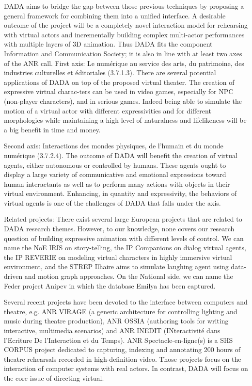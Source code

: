 DADA aims to bridge the gap between those previous techniques by proposing a general framework for combining them into a unified interface. A desirable outcome of the project will be a completely novel interaction model for rehearsing with virtual actors and incrementally building complex multi-actor performances with multiple layers of 3D animation. Thus DADA fits the component Information and Communication Society; it is also in line with at least two axes of the ANR call.
First axis: Le num\'erique au service des arts, du patrimoine, des industries culturelles et \'editoriales (3.7.1.3). There are several potential applications of DADA on top of the proposed virtual theater. The creation of expressive virtual charac-ters can be used in video games, especially for NPC (non-player characters), and in serious games. Indeed being able to simulate the motion of a virtual actor with different expressivities and for different morphologies while maintaining a high level of naturalness and lifelikeness will be a big benefit in time and money.


Second axis: Interactions des mondes physiques, de l'humain et du monde num\'erique (3.7.2.4). The outcome of DADA
will benefit the creation of virtual agents, either autonomous or controlled by humans. These agents ought to display a
large variety of communicative and emotional expressions toward human interactants as well as to perform many actions with objects in their virtual environment. Enhancing, in quantity and expressivity, the behaviors of virtual agents is one of the challenges of DADA that falls under the axis.

Related projects: There exist several large European projects that are related to DADA research themes. However, to our knowledge, none covers our research question of building expressive animation with different levels of control. We can name the NoE IRIS on story-telling, the IP Companions on dialog virtual agents, the IP REVERIE on modeling virtual characters in highly immersive virtual environment, and the STREP Ilhaire aims to simulate laughing agent using data-driven and motion graph approaches. On the National side, we can name the Feder project Anipev in which the database Emilya has been captured.

Several recent projects have been devoted to the interface between computers and theatre, e.g. ANR VIRAGE (a generic architecture for controlling lighting and music during theatre production), ANR OSSIA (authoring tools for writing interactive, multimedia scenarios) and ANR INEDIT (INteractivit\'e dans l'Ecriture De l'Interaction et du Temps). ANR Spectacle-en-ligne(s) is a SHS CORPUS project dedicated to capturing, indexing and annotating 200 hours of theatre rehearsals recorded in high-definition video. Those projects focus on the interaction of computer systems with real actors. In contrast, DADA will focus on the core issue of directing virtual.


